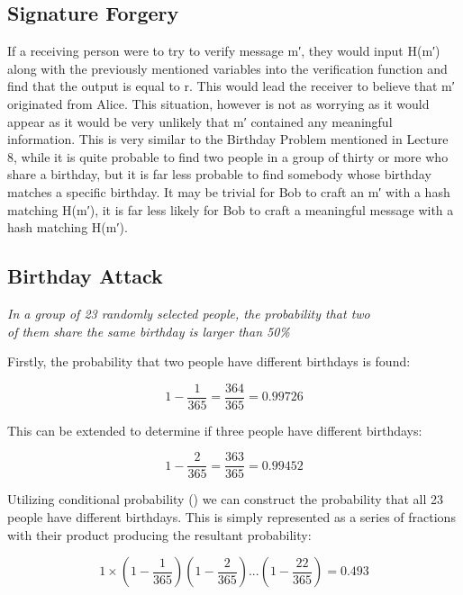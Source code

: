 \documentclass[]{article}
\begin{document}
\subsection*{Signature Forgery}

 If a receiving person were to try to verify message m′, they would input H(m′) along with the previously mentioned variables into the verification function and find that the output is equal to r. This would lead the receiver to believe that m′ originated from Alice. This situation, however is not as worrying as it would appear as it would be very unlikely that m′ contained any meaningful information. This is very similar to the Birthday Problem mentioned in Lecture 8, while it is quite probable to find two people in a group of thirty or more who share a birthday, but it is far less probable to find somebody whose birthday matches a specific birthday. It may be trivial for Bob to craft an m′ with a hash matching H(m′), it is far less likely for Bob to craft a meaningful message with a hash matching H(m′).

\subsection*{Birthday Attack}

\vspace{0.5cm}
\begin{center}
\textit{In a group of 23 randomly selected people, the probability that two\\ of them share the same birthday is larger than 50\%}
\end{center}
\vspace{0.5cm}

\noindent
Firstly, the probability that two people have different birthdays is found:

$$1-\frac{1}{365}=\frac{364}{365}=0.99726$$

\vspace{0.5cm}
\noindent
This can be extended to determine if three people have different birthdays:

$$1-\frac{2}{365}=\frac{363}{365}=0.99452$$

\vspace{0.5cm}
\noindent
Utilizing conditional probability (\cite{lecture2}) we can construct the probability that all 23 people have different birthdays. This is simply represented as a series of fractions with their product producing the resultant probability:

$$1\times(1-\frac{1}{365})(1-\frac{2}{365})...(1-\frac{22}{365})=0.493$$
\end{document}

